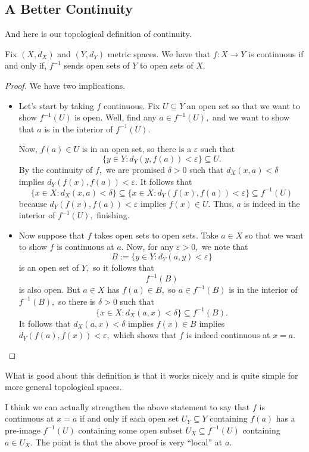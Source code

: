 \subsection{A Better Continuity}
And here is our topological definition of continuity.
\begin{theorem}
	Fix $(X,d_X)$ and $(Y,d_Y)$ metric spaces. We have that $f:X\to Y$ is continuous if and only if, $f^{-1}$ sends open sets of $Y$ to open sets of $X.$
\end{theorem}
\begin{proof}
	We have two implications.
	\begin{itemize}
		\item Let's start by taking $f$ continuous. Fix $U\subseteq Y$ an open set so that we want to show $f^{-1}(U)$ is open. Well, find any $a\in f^{-1}(U),$ and we want to show that $a$ is in the interior of $f^{-1}(U).$

		Now, $f(a)\in U$ is in an open set, so there is a $\varepsilon$ such that
		\[\{y\in Y:d_Y(y,f(a))<\varepsilon\}\subseteq U.\]
		By the continuity of $f,$ we are promised $\delta>0$ such that $d_X(x,a)<\delta$ implies $d_Y(f(x),f(a))<\varepsilon.$ It follows that
		\[\{x\in X:d_X(x,a)<\delta\}\subseteq\{x\in X:d_Y(f(x),f(a))<\varepsilon\}\subseteq f^{-1}(U)\]
		because $d_Y(f(x),f(a))<\varepsilon$ implies $f(x)\in U.$ Thus, $a$ is indeed in the interior of $f^{-1}(U),$ finishing.
		\item Now suppose that $f$ takes open sets to open sets. Take $a\in X$ so that we want to show $f$ is continuous at $a.$ Now, for any $\varepsilon>0,$ we note that
		\[B:=\{y\in Y:d_Y(a,y)<\varepsilon\}\]
		is an open set of $Y,$ so it follows that
		\[f^{-1}(B)\]
		is also open. But $a\in X$ has $f(a)\in B,$ so $a\in f^{-1}(B)$ is in the interior of $f^{-1}(B),$ so there is $\delta>0$ such that
		\[\{x\in X:d_X(a,x)<\delta\}\subseteq f^{-1}(B).\]
		It follows that $d_X(a,x)<\delta$ implies $f(x)\in B$ implies $d_Y(f(a),f(x))<\varepsilon,$ which shows that $f$ is indeed continuous at $x=a.$
		\qedhere
	\end{itemize}
\end{proof}
\begin{remark}
	What is good about this definition is that it works nicely and is quite simple for more general topological spaces.
\end{remark}
\begin{remark}
	I think we can actually strengthen the above statement to say that $f$ is continuous at $x=a$ if and only if each open set $U_Y\subseteq Y$ containing $f(a)$ has a pre-image $f^{-1}(U)$ containing some open subset $U_X\subseteq f^{-1}(U)$ containing $a\in U_X.$ The point is that the above proof is very ``local'' at $a.$
\end{remark}
